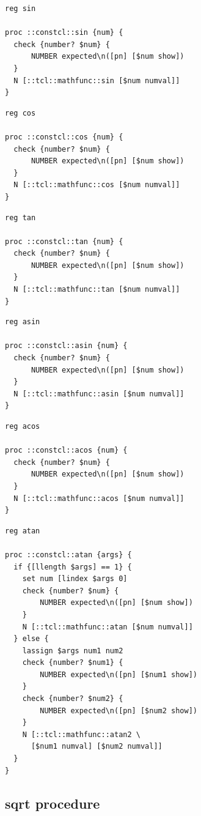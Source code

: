\documentclass[twoside]{report}
\begin{document}
\begin{lstlisting}
reg sin

proc ::constcl::sin {num} {
  check {number? $num} {
      NUMBER expected\n([pn] [$num show])
  }
  N [::tcl::mathfunc::sin [$num numval]]
}
\end{lstlisting}

\begin{lstlisting}
reg cos

proc ::constcl::cos {num} {
  check {number? $num} {
      NUMBER expected\n([pn] [$num show])
  }
  N [::tcl::mathfunc::cos [$num numval]]
}
\end{lstlisting}

\begin{lstlisting}
reg tan

proc ::constcl::tan {num} {
  check {number? $num} {
      NUMBER expected\n([pn] [$num show])
  }
  N [::tcl::mathfunc::tan [$num numval]]
}
\end{lstlisting}

\begin{lstlisting}
reg asin

proc ::constcl::asin {num} {
  check {number? $num} {
      NUMBER expected\n([pn] [$num show])
  }
  N [::tcl::mathfunc::asin [$num numval]]
}
\end{lstlisting}

\begin{lstlisting}
reg acos

proc ::constcl::acos {num} {
  check {number? $num} {
      NUMBER expected\n([pn] [$num show])
  }
  N [::tcl::mathfunc::acos [$num numval]]
}
\end{lstlisting}

\begin{lstlisting}
reg atan

proc ::constcl::atan {args} {
  if {[llength $args] == 1} {
    set num [lindex $args 0]
    check {number? $num} {
        NUMBER expected\n([pn] [$num show])
    }
    N [::tcl::mathfunc::atan [$num numval]]
  } else {
    lassign $args num1 num2
    check {number? $num1} {
        NUMBER expected\n([pn] [$num1 show])
    }
    check {number? $num2} {
        NUMBER expected\n([pn] [$num2 show])
    }
    N [::tcl::mathfunc::atan2 \
      [$num1 numval] [$num2 numval]]
  }
}
\end{lstlisting}

\subsection{sqrt procedure}
\label{sqrt-procedure}
\end{document}
